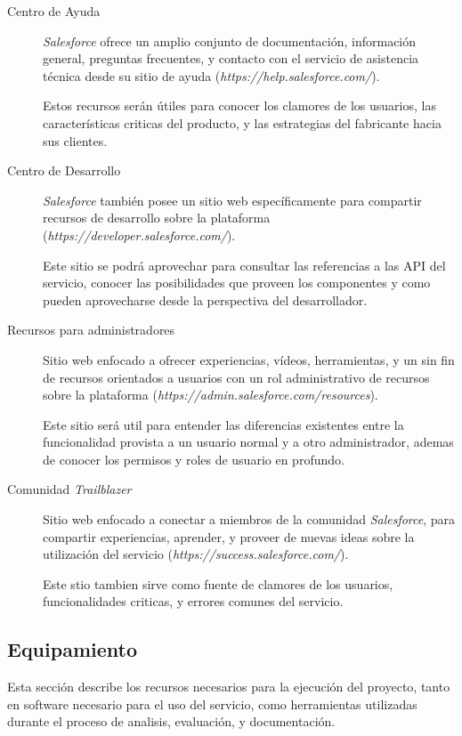 \begin{description}
\item [Centro de Ayuda] \emph{Salesforce} ofrece un amplio conjunto de
documentación, información general, preguntas frecuentes, y contacto con el
servicio de asistencia técnica desde su sitio de ayuda
(\emph{https://help.salesforce.com/}).

Estos recursos serán útiles para conocer los clamores de los usuarios, las
características criticas del producto, y las estrategias del fabricante hacia
sus clientes.

\item [Centro de Desarrollo] \emph{Salesforce} también posee un sitio web
específicamente para compartir recursos de desarrollo sobre la plataforma
(\emph{https://developer.salesforce.com/}).

Este sitio se podrá aprovechar para consultar las referencias a las API del
servicio, conocer las posibilidades que proveen los componentes y como pueden
aprovecharse desde la perspectiva del desarrollador.

\item [Recursos para administradores] Sitio web enfocado a ofrecer experiencias,
vídeos, herramientas, y un sin fin de recursos orientados a usuarios con un rol
administrativo de recursos sobre la plataforma
(\emph{https://admin.salesforce.com/resources}).

Este sitio será util para entender las diferencias existentes entre la
funcionalidad provista a un usuario normal y a otro administrador, ademas de
conocer los permisos y roles de usuario en profundo.

\item [Comunidad \emph{Trailblazer}] Sitio web enfocado a conectar a miembros de
la comunidad \emph{Salesforce}, para compartir experiencias, aprender, y proveer
de nuevas ideas sobre la utilización del servicio
(\emph{https://success.salesforce.com/}).

Este stio tambien sirve como fuente de clamores de los usuarios, funcionalidades
criticas, y errores comunes del servicio.

\end{description}

\subsection{Equipamiento}
Esta sección describe los recursos necesarios para la ejecución del
proyecto, tanto en software necesario para el uso del servicio,  como
herramientas utilizadas durante el proceso de analisis, evaluación, y
documentación.

